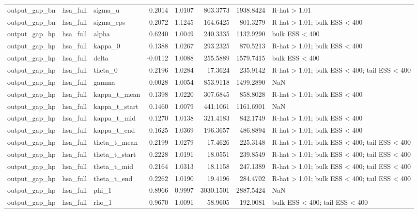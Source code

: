 \begin{tabular}{lllrrrrl}
output\_gap\_bn & hsa\_full & sigma\_u & 0.2014 & 1.0107 & 803.3773 & 1938.8424 & R-hat > 1.01 \\
output\_gap\_bn & hsa\_full & sigma\_eps & 0.2072 & 1.1245 & 164.6425 & 801.3279 & R-hat > 1.01; bulk ESS < 400 \\
output\_gap\_hp & hsa\_full & alpha & 0.6240 & 1.0049 & 240.3335 & 1132.9290 & bulk ESS < 400 \\
output\_gap\_hp & hsa\_full & kappa\_0 & 0.1388 & 1.0267 & 293.2325 & 870.5213 & R-hat > 1.01; bulk ESS < 400 \\
output\_gap\_hp & hsa\_full & delta & -0.0112 & 1.0088 & 255.5889 & 1579.7415 & bulk ESS < 400 \\
output\_gap\_hp & hsa\_full & theta\_0 & 0.2196 & 1.0284 & 17.3624 & 235.9142 & R-hat > 1.01; bulk ESS < 400; tail ESS < 400 \\
output\_gap\_hp & hsa\_full & gamma & -0.0028 & 1.0054 & 853.9118 & 1499.2890 & NaN \\
output\_gap\_hp & hsa\_full & kappa\_t\_mean & 0.1398 & 1.0220 & 307.6845 & 858.8028 & R-hat > 1.01; bulk ESS < 400 \\
output\_gap\_hp & hsa\_full & kappa\_t\_start & 0.1460 & 1.0079 & 441.1061 & 1161.6901 & NaN \\
output\_gap\_hp & hsa\_full & kappa\_t\_mid & 0.1270 & 1.0138 & 321.4183 & 842.1749 & R-hat > 1.01; bulk ESS < 400 \\
output\_gap\_hp & hsa\_full & kappa\_t\_end & 0.1625 & 1.0369 & 196.3657 & 486.8894 & R-hat > 1.01; bulk ESS < 400 \\
output\_gap\_hp & hsa\_full & theta\_t\_mean & 0.2199 & 1.0279 & 17.4626 & 225.3148 & R-hat > 1.01; bulk ESS < 400; tail ESS < 400 \\
output\_gap\_hp & hsa\_full & theta\_t\_start & 0.2228 & 1.0191 & 18.0551 & 239.8549 & R-hat > 1.01; bulk ESS < 400; tail ESS < 400 \\
output\_gap\_hp & hsa\_full & theta\_t\_mid & 0.2164 & 1.0313 & 18.1158 & 247.1389 & R-hat > 1.01; bulk ESS < 400; tail ESS < 400 \\
output\_gap\_hp & hsa\_full & theta\_t\_end & 0.2262 & 1.0190 & 19.4196 & 284.4702 & R-hat > 1.01; bulk ESS < 400; tail ESS < 400 \\
output\_gap\_hp & hsa\_full & phi\_1 & 0.8966 & 0.9997 & 3030.1501 & 2887.5424 & NaN \\
output\_gap\_hp & hsa\_full & rho\_1 & 0.9670 & 1.0091 & 58.9605 & 192.0081 & bulk ESS < 400; tail ESS < 400 \\

\end{tabular}
